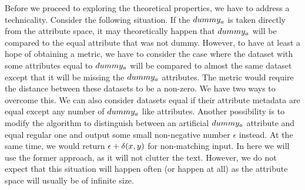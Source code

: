 Before we proceed to exploring the theoretical properties, we have to address a technicality. Consider the following situation. If the $dummy_a$ is taken directly from the attribute space, it may theoretically happen that $dummy_a$ will be compared to the equal attribute that was not dummy. However, to have at least a hope of obtaining a metric, we have to consider the case where the dataset with some attributes equal to $dummy_a$ will be compared to almost the same dataset except that it will be missing the $dummy_a$ attributes. The metric would require the distance between these datasets to be a non-zero. We have two ways to overcome this. We can also consider datasets equal if their attribute metadata are equal except any number of $dummy_a$ like attributes. Another possibility is to modify the algorithm to distinguish between an artificial  $dummy_a$ attribute and equal regular one and output some small non-negative number $\epsilon$ instead. At the same time, we would return $\epsilon + \delta(x,y)$ for non-matching input.
 In here we will use the former approach, as it will not clutter the text. However, we do not expect that this situation will happen often (or happen at all) as the attribute space will usually be of infinite size. 

